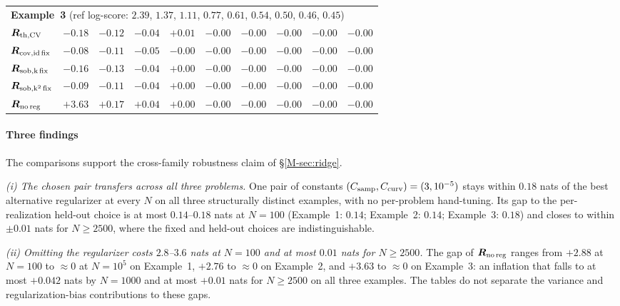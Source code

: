\documentclass[supplement,review,hidelinks,onefignum,onetabnum]{siamart251216}
\newcommand{\mR}{\bm{R}}
\begin{document}
\begin{table}[h]
\begin{tabular}{l|rrrrrrrrr}
\midrule
\multicolumn{10}{l}{\textbf{Example~3} \quad (ref log-score: $2.39$, $1.37$, $1.11$, $0.77$, $0.61$, $0.54$, $0.50$, $0.46$, $0.45$)} \\
$\mR_{\rm th,CV}$         & $-0.18$ & $-0.12$ & $-0.04$ & $+0.01$ & $-0.00$ & $-0.00$ & $-0.00$ & $-0.00$ & $-0.00$ \\
$\mR_{\rm cov,id\,fix}$    & $-0.08$ & $-0.11$ & $-0.05$ & $-0.00$ & $-0.00$ & $-0.00$ & $-0.00$ & $-0.00$ & $-0.00$ \\
$\mR_{\rm sob,k\,fix}$     & $-0.16$ & $-0.13$ & $-0.04$ & $+0.00$ & $-0.00$ & $-0.00$ & $-0.00$ & $-0.00$ & $-0.00$ \\
$\mR_{\rm sob,k^2\,fix}$   & $-0.09$ & $-0.11$ & $-0.04$ & $+0.00$ & $-0.00$ & $-0.00$ & $-0.00$ & $-0.00$ & $-0.00$ \\
$\mR_{\rm no\,reg}$       & $+3.63$ & $+0.17$ & $+0.04$ & $+0.00$ & $-0.00$ & $-0.00$ & $-0.00$ & $-0.00$ & $-0.00$ \\
\bottomrule
\end{tabular}
\end{table}

\paragraph{Three findings} The comparisons support the cross-family robustness claim of \S\ref{M-sec:ridge}.

\textit{(i) The chosen pair transfers across all three problems.} One pair of constants $(C_{\rm samp}, C_{\rm curv}) = (3, 10^{-5})$ stays within $0.18$ nats of the best alternative regularizer at every $N$ on all three structurally distinct examples, with no per-problem hand-tuning. Its gap to the per-realization held-out choice is at most $0.14$--$0.18$ nats at $N=100$ (Example~1: $0.14$; Example~2: $0.14$; Example~3: $0.18$) and closes to within $\pm 0.01$ nats for $N \geq 2500$, where the fixed and held-out choices are indistinguishable.

\textit{(ii) Omitting the regularizer costs $2.8$--$3.6$ nats at $N = 100$ and at most $0.01$ nats for $N \ge 2500$.} The gap of $\mR_{\rm no\,reg}$ ranges from $+2.88$ at $N=100$ to $\approx 0$ at $N=10^5$ on Example~1, $+2.76$ to $\approx 0$ on Example~2, and $+3.63$ to $\approx 0$ on Example~3: an inflation that falls to at most $+0.042$ nats by $N = 1000$ and at most $+0.01$ nats for $N \geq 2500$ on all three examples. The tables do not separate the variance and regularization-bias contributions to these gaps.
\end{document}
